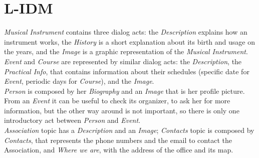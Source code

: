 \documentclass[../../DD.tex]{subfiles}
\begin{document}
\section{L-IDM}
	\textit{Musical Instrument} contains three dialog acts: the \textit{Description} explains how an instrument works, the \textit{History} is a short explanation about its birth and usage on the years, and the \textit{Image} is a graphic representation of the \textit{Musical Instrument}. \textit{Event} and \textit{Course} are represented by similar dialog acts: the \textit{Description}, the \textit{Practical Info}, that contains information about their schedules (specific date for \textit{Event}, periodic days for \textit{Course}), and the \textit{Image}.\\
	\textit{Person} is composed by her \textit{Biography} and an \textit{Image} that is her profile picture. From an \textit{Event} it can be useful to check its organizer, to ask her for more information, but the other way around is not important, so there is only one introductory act between \textit{Person} and \textit{Event}.\\
	\textit{Association} topic has a \textit{Description} and an \textit{Image}; \textit{Contacts} topic is composed by \textit{Contacts}, that represents the phone numbers and the email to contact the Association, and \textit{Where we are}, with the address of the office and its map.
\end{document}
